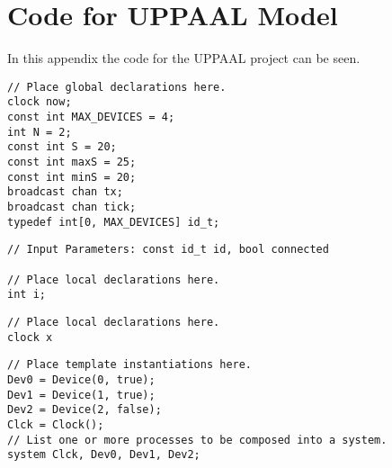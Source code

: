 \chapter{Code for UPPAAL Model}\label{app:UPPAALCode}
In this appendix the code for the UPPAAL project can be seen.

\begin{lstlisting}[language={[GUI]Uppaal}, % use GUI flavor
columns={[l]flexible},
frameround=fftt, frame=shadowbox, rulesepcolor=\color{gray},
caption={Code for the global declarations.}]
// Place global declarations here.
clock now;
const int MAX_DEVICES = 4;
int N = 2;
const int S = 20;
const int maxS = 25;
const int minS = 20;
broadcast chan tx;
broadcast chan tick;
typedef int[0, MAX_DEVICES] id_t;
\end{lstlisting}


\begin{lstlisting}[language={[GUI]Uppaal}, % use GUI flavor
columns={[l]flexible},
frameround=fftt, frame=shadowbox, rulesepcolor=\color{gray},
caption={Code for the local declarations for Device.}]
// Input Parameters: const id_t id, bool connected

// Place local declarations here.
int i;
\end{lstlisting}

\begin{lstlisting}[language={[GUI]Uppaal}, % use GUI flavor
columns={[l]flexible},
frameround=fftt, frame=shadowbox, rulesepcolor=\color{gray},
caption={Code for the local declarations for Clock.}]
// Place local declarations here.
clock x
\end{lstlisting}

\begin{lstlisting}[language={[GUI]Uppaal}, % use GUI flavor
columns={[l]flexible},
frameround=fftt, frame=shadowbox, rulesepcolor=\color{gray},
caption={Code for system declarations.}]
// Place template instantiations here.
Dev0 = Device(0, true);
Dev1 = Device(1, true);
Dev2 = Device(2, false);
Clck = Clock();
// List one or more processes to be composed into a system.
system Clck, Dev0, Dev1, Dev2;
\end{lstlisting}